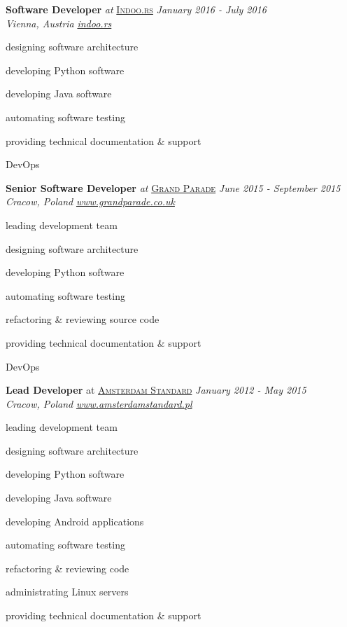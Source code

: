 \documentclass[10pt]{article}
\newenvironment{innerlist}[1][\enskip\textbullet]%
        {\begin{compactitem}[#1]}{\end{compactitem}}
\begin{document}
\textbf{Software Developer} \textit{at} \href{http://indoo.rs/}{\textsc{Indoo.rs}} \hfill \textit{January 2016 - July 2016} \\
\textit{Vienna, Austria} 
\hfill \href{http://indoor.rs/}{\textit{indoo.rs}} 
\vspace{0.1in}
\begin{innerlist}
\item designing software architecture
\item developing Python software
\item developing Java software
\item automating software testing
\item providing technical documentation \& support
\item DevOps
\end{innerlist}

\pagebreak

\textbf{Senior Software Developer} \textit{at} \href{http://www.grandparade.co.uk/}{\textsc{Grand Parade}} \hfill \textit{June 2015 - September 2015} \\
\textit{Cracow, Poland} 
\hfill \href{http://www.grandparade.co.uk/}{\textit{www.grandparade.co.uk}} 
\vspace{0.1in}
\begin{innerlist}
\item leading development team
\item designing software architecture
\item developing Python software
\item automating software testing
\item refactoring \& reviewing source code
\item providing technical documentation \& support
\item DevOps
\end{innerlist}

\vspace{0.30in}

\textbf{Lead Developer} at \href{http://amsterdamstandard.pl/}{\textsc{Amsterdam Standard}} 
\hfill \textit{January 2012 - May 2015} \\
\textit{Cracow, Poland}
 \hfill \href{http://amsterdamstandard.pl/}{\textit{www.amsterdamstandard.pl}} 
 \vspace{0.1in}
\begin{innerlist}
\item leading development team
\item designing software architecture
\item developing Python software
\item developing Java software
\item developing Android applications
\item automating software testing
\item refactoring \& reviewing code
\item administrating Linux servers
\item providing technical documentation \& support
\end{innerlist}
\end{document}
